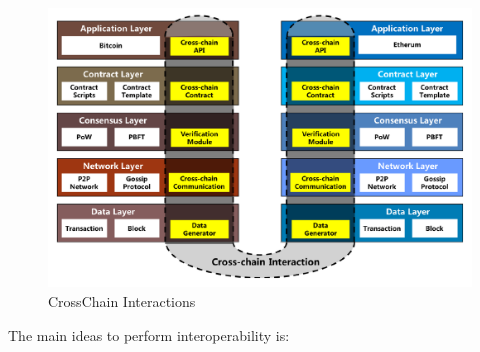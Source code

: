 \begin{figure}[h!]
	\centering
	\includegraphics[totalheight=6cm]{img/crosschain.PNG}
	\caption{CrossChain Interactions}
	\label{fig:crosschain-interaction}
\end{figure}

The main ideas to perform interoperability is:

